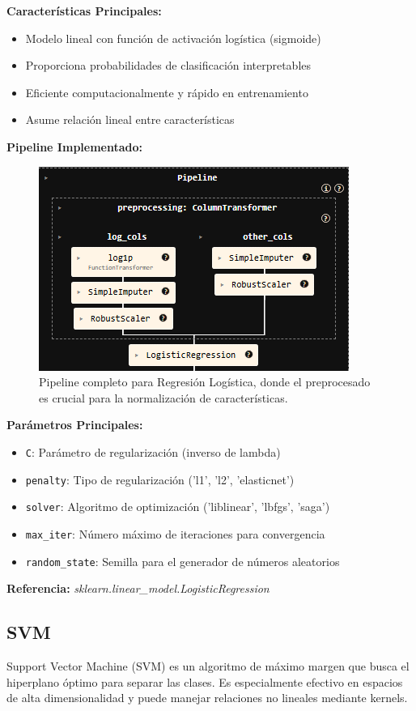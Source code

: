 \documentclass{article}
\begin{document}
\textbf{Características Principales:}
\begin{itemize}
    \item Modelo lineal con función de activación logística (sigmoide)
    \item Proporciona probabilidades de clasificación interpretables
    \item Eficiente computacionalmente y rápido en entrenamiento
    \item Asume relación lineal entre características
\end{itemize}

\textbf{Pipeline Implementado:}
\begin{figure}[H]
    \centering
    \includegraphics[width=0.4\linewidth]{pipeline_logistic_regression.png}
    \caption{Pipeline completo para Regresión Logística, donde el preprocesado es crucial para la normalización de características.}
    \label{fig:pipeline_lr}
\end{figure}

\textbf{Parámetros Principales:}
\begin{itemize}
    \item \texttt{C}: Parámetro de regularización (inverso de lambda)
    \item \texttt{penalty}: Tipo de regularización ('l1', 'l2', 'elasticnet')
    \item \texttt{solver}: Algoritmo de optimización ('liblinear', 'lbfgs', 'saga')
    \item \texttt{max\_iter}: Número máximo de iteraciones para convergencia
    \item \texttt{random\_state}: Semilla para el generador de números aleatorios
\end{itemize}

\textbf{Referencia:} \textit{sklearn.linear\_model.LogisticRegression} \cite{sklearn_lr}

\subsection{SVM}

Support Vector Machine (SVM) es un algoritmo de máximo margen que busca el hiperplano óptimo para separar las clases. Es especialmente efectivo en espacios de alta dimensionalidad y puede manejar relaciones no lineales mediante kernels.
\end{document}
